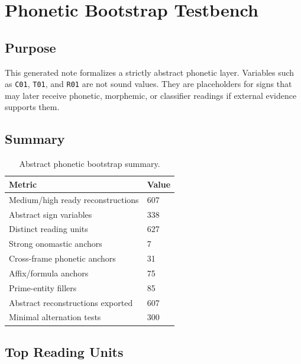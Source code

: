 \section{Phonetic Bootstrap Testbench}

\subsection{Purpose}

This generated note formalizes a strictly abstract phonetic layer. Variables such as \texttt{C01}, \texttt{T01}, and \texttt{R01} are not sound values. They are placeholders for signs that may later receive phonetic, morphemic, or classifier readings if external evidence supports them.

\subsection{Summary}

\begin{table}[htbp]
\centering
\begin{tabular}{ll}
\toprule
\textbf{Metric} & \textbf{Value} \\
\midrule
Medium/high ready reconstructions & 607 \\
Abstract sign variables & 338 \\
Distinct reading units & 627 \\
Strong onomastic anchors & 7 \\
Cross-frame phonetic anchors & 31 \\
Affix/formula anchors & 75 \\
Prime-entity fillers & 85 \\
Abstract reconstructions exported & 607 \\
Minimal alternation tests & 300 \\
\bottomrule
\end{tabular}
\caption{Abstract phonetic bootstrap summary.}
\end{table}

\subsection{Top Reading Units}

